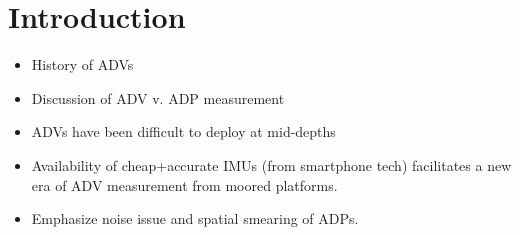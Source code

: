 
\section{Introduction}

\begin{itemize}
\item History of ADVs
\item Discussion of ADV v. ADP measurement
\item ADVs have been difficult to deploy at mid-depths
\item Availability of cheap+accurate IMUs (from smartphone tech) facilitates a new era of ADV measurement from moored platforms.
\item Emphasize noise issue and spatial smearing of ADPs.
\end{itemize}



